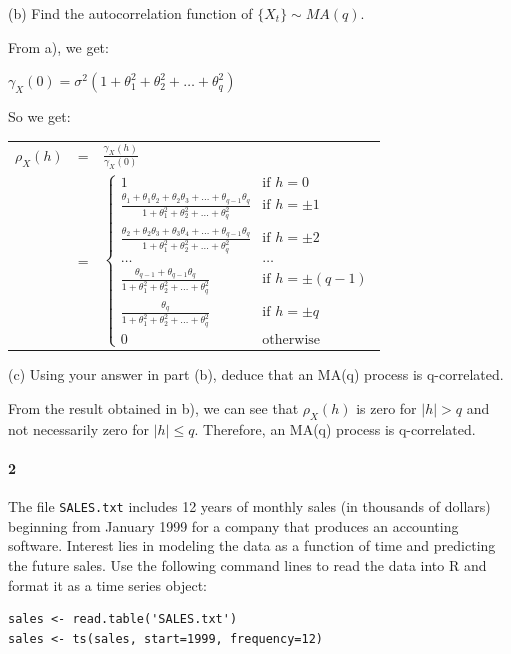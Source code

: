 \documentclass[]{article}
\let\oldparagraph\paragraph
\renewcommand{\paragraph}[1]{\oldparagraph{#1}\mbox{}}
\begin{document}
(b) Find the autocorrelation function of $\{X_t\} \sim MA(q)$.

\color{blue}
From a), we get:

$\gamma_X(0) = \sigma^2(1 + \theta_1^2 + \theta_2^2 + \ldots + \theta_q^2)$

So we get:

\begin{tabular}{ccl}
$\rho_X(h)$ & = & $\frac{\gamma_X(h)}{\gamma_X(0)}$\\
            & = &
$\begin{cases}
1 & \mbox{if } h = 0\\
\frac{\theta_1 + \theta_1 \theta_2 + \theta_2 \theta_3 + \ldots + \theta_{q-1} \theta_q}{1 + \theta_1^2 + \theta_2^2 + \ldots + \theta_q^2} & \mbox{if } h = \pm 1\\
\frac{\theta_2 + \theta_2 \theta_3 + \theta_3 \theta_4 + \ldots + \theta_{q-1} \theta_q}{1 + \theta_1^2 + \theta_2^2 + \ldots + \theta_q^2} & \mbox{if } h = \pm 2\\
\ldots & \ldots\\
\frac{\theta_{q-1} + \theta_{q-1} \theta_q}{1 + \theta_1^2 + \theta_2^2 + \ldots + \theta_q^2} & \mbox{if } h = \pm (q-1)\\
\frac{\theta_q}{1 + \theta_1^2 + \theta_2^2 + \ldots + \theta_q^2} & \mbox{if } h = \pm q\\
0 & \mbox{otherwise}
\end{cases}$\\
\end{tabular}
\color{black}

(c) Using your answer in part (b), deduce that an MA(q) process is q-correlated.

\color{blue}
From the result obtained in b), we can see that $\rho_X(h)$ is zero for $|h| > q$ and not necessarily zero for $|h| \leq q$. Therefore, an MA(q) process is q-correlated.
\color{black}

\paragraph{2}
The file \texttt{SALES.txt} includes 12 years of monthly sales (in thousands of dollars) beginning from January 1999 for a company that produces an accounting software. Interest lies in modeling the data as a function of time and predicting the future sales. Use the following command lines to read the data into R and format it as a time series object:

\begin{Verbatim}[frame=single]
sales <- read.table('SALES.txt')
sales <- ts(sales, start=1999, frequency=12)
\end{Verbatim}
\end{document}
